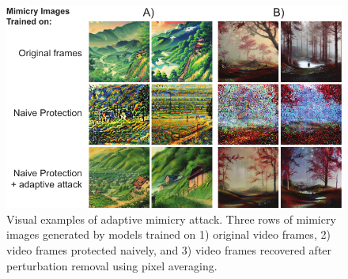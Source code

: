 \begin{figure}[t]
  \centering
  \includegraphics[width=1\columnwidth]{plots/pixel-avging-success-eps-converted-to.pdf}
  \vspace{-0.3in}
  \caption{Visual examples of adaptive mimicry attack. Three rows of
      mimicry images generated by models trained on 1) original video frames,
    2) video frames protected naively, and 3) video frames recovered after
    perturbation removal using pixel averaging.}
  \label{fig:style-mimicry-attacked}
\end{figure}

\begin{table}[t]
  \centering
    \caption{Latent $L_2$ Norm between original frames, protected frames
    and protected frames after perturbation removal.}
\label{tab:loss-removal-results}
\vspace{-0.2in}
\end{table}


